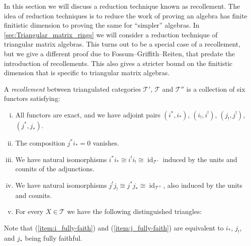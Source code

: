 In this section we will discuss a reduction technique known as recollement. The idea of reduction techniques is to reduce the work of proving an algebra has finite finitistic dimension to proving the same for ``simpler'' algebras. In \cref{sec:Triangular_matrix_rings} we will consider a reduction technique of triangular matrix algebras. This turns out to be a special case of a recollement, but we give a different proof due to Fossum--Griffith--Reiten, that predate the introduction of recollements. This also gives a stricter bound on the finitistic dimension that is specific to triangular matrix algebras.

\begin{defn}[Recollement]\label{def:recollement}
	A \emph{recollement} between triangulated categories $\mathcal T'$, $\mathcal T$ and $\mathcal T''$ is a collection of six functors satisfying:
\begin{center}
\end{center}

\begin{enumerate}[(i)]
	\item All functors are exact, and we have adjoint pairs $(i^*, i_*)$, $(i_!, i^!)$, $(j_!, j^!)$, $(j^*, j_*)$. 
	\item \label{recollement:vanishing_composition}The composition $j^*i_*=0$ vanishes.
	\item \label{item:i_fully-faith} 
	We have natural isomorphisms $i^*i_* \cong i^!i_! \cong \operatorname{id}_{\mathcal T'}$ induced by the units and counits of the adjunctions. 
	\item \label{item:j_fully-faith}
	We have natural isomorphisms $j^!j_! \cong j^*j_* \cong \operatorname{id}_{\mathcal T''}$, also induced by the units and counits. 
	\item \label{recollement:triangles}
	For every $X \in \mathcal T$ we have the following distinguished triangles:
	\begin{center}
	\end{center}
\end{enumerate}
Note that (\ref{item:i_fully-faith}) and (\ref{item:j_fully-faith}) are equivalent to $i_*$, $j_!$, and $j_*$ being fully faithful.
\end{defn}

